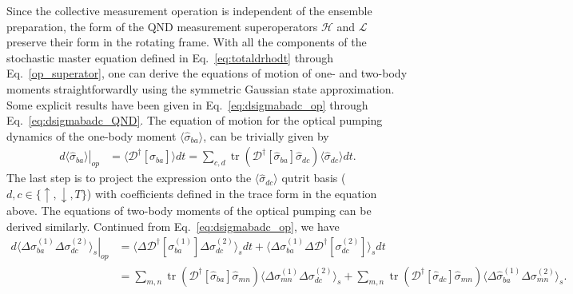 \documentclass[preprint,aps,pra,onecolumn,superscriptaddress]{revtex4-1} %
\DeclareMathOperator{\tr}{tr}
\newcommand{\nn}{\nonumber}
\newcommand{\expect}[1]{\big\langle #1 \big\rangle}
\begin{document}
\begin{appendix}
Since the collective measurement operation is independent of the ensemble preparation, the form of the QND measurement superoperators $ \mathcal{H} $ and $ \mathcal{L} $ preserve their form in the rotating frame. With all the components of the stochastic master equation defined in Eq.~\eqref{eq:totaldrhodt} through Eq.~\eqref{op_superator}, one can derive the equations of motion of one- and two-body moments straightforwardly using the symmetric Gaussian state approximation. Some explicit results have been given in Eq.~\eqref{eq:dsigmabadc_op} through Eq.~\eqref{eq:dsigmabadc_QND}. The equation of motion for the optical pumping dynamics of the one-body moment $ \expect{\hat{\sigma}_{ba}} $, can be trivially given by
\begin{align}
\left.d\expect{\hat{\sigma}_{ba}}\right|_{op}&= \expect{\mathcal{D}^\dagger\left[\hat{\sigma}_{ba} \right]}dt=\sum_{c,d}\tr(\mathcal{D}^\dagger\left[\hat{\sigma}_{ba}\right]\hat{\sigma}_{dc} )\expect{\hat{\sigma}_{dc}}dt.\label{eq:dsigmaba_op_expand}
\end{align}
The last step is to project the expression onto the $ \expect{\hat{\sigma}_{dc}} $ qutrit basis ($ d,c\in \{\uparrow,\downarrow,T\} $) with coefficients defined in the trace form in the equation above. The equations of two-body moments of the optical pumping can be derived similarly. Continued from Eq.~\eqref{eq:dsigmabadc_op}, we have 
\begin{align}
\left.d\expect{\!\Delta \sigma_{ba}^{(\!1\!)}\Delta\sigma_{dc}^{(\!2\!)} }_s\right|_{op} &\!\!= \expect{\Delta\mathcal{D}^\dagger[ \sigma_{ba}^{(1)}]\Delta\sigma_{dc}^{(2)} }_sdt + \expect{\Delta \sigma_{ba}^{(1)} \Delta\mathcal{D}^\dagger[\sigma_{dc}^{(2)}] }_sdt\nn \\
&\!\!=\!\sum_{m,n}\! \tr\!\left(\mathcal{D}^\dagger[\hat{\sigma}_{ba} ]\hat{\sigma}_{mn} \right)\!\expect{\!\Delta\sigma_{mn}^{(\!1\!)}\Delta\sigma_{dc}^{(\!2\!)} }_s \!\!+\!\! \sum_{m,n}\!\tr\!\left(\mathcal{D}^\dagger[\hat{\sigma}_{dc}]\hat{\sigma}_{mn} \right)\!\expect{\!\Delta\hat{\sigma}_{ba}^{(\!1\!)}\Delta\sigma_{mn}^{(\!2\!)} }_s .\label{eq:dsigmabadc_op_expand}
\end{align} 

\end{appendix}
\end{document}

